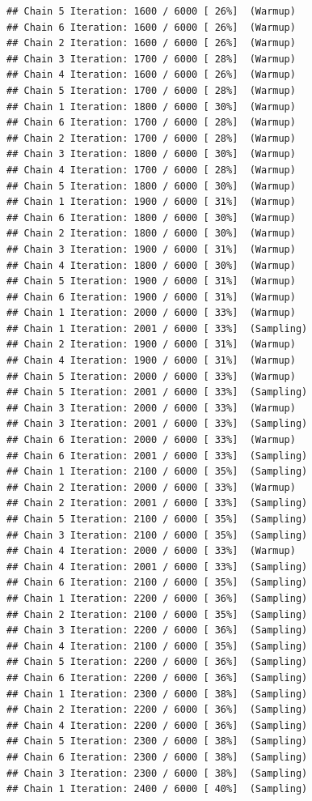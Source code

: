 \documentclass[
]{article}
\begin{document}
\begin{verbatim}
## Chain 5 Iteration: 1600 / 6000 [ 26%]  (Warmup) 
## Chain 6 Iteration: 1600 / 6000 [ 26%]  (Warmup) 
## Chain 2 Iteration: 1600 / 6000 [ 26%]  (Warmup) 
## Chain 3 Iteration: 1700 / 6000 [ 28%]  (Warmup) 
## Chain 4 Iteration: 1600 / 6000 [ 26%]  (Warmup) 
## Chain 5 Iteration: 1700 / 6000 [ 28%]  (Warmup) 
## Chain 1 Iteration: 1800 / 6000 [ 30%]  (Warmup) 
## Chain 6 Iteration: 1700 / 6000 [ 28%]  (Warmup) 
## Chain 2 Iteration: 1700 / 6000 [ 28%]  (Warmup) 
## Chain 3 Iteration: 1800 / 6000 [ 30%]  (Warmup) 
## Chain 4 Iteration: 1700 / 6000 [ 28%]  (Warmup) 
## Chain 5 Iteration: 1800 / 6000 [ 30%]  (Warmup) 
## Chain 1 Iteration: 1900 / 6000 [ 31%]  (Warmup) 
## Chain 6 Iteration: 1800 / 6000 [ 30%]  (Warmup) 
## Chain 2 Iteration: 1800 / 6000 [ 30%]  (Warmup) 
## Chain 3 Iteration: 1900 / 6000 [ 31%]  (Warmup) 
## Chain 4 Iteration: 1800 / 6000 [ 30%]  (Warmup) 
## Chain 5 Iteration: 1900 / 6000 [ 31%]  (Warmup) 
## Chain 6 Iteration: 1900 / 6000 [ 31%]  (Warmup) 
## Chain 1 Iteration: 2000 / 6000 [ 33%]  (Warmup) 
## Chain 1 Iteration: 2001 / 6000 [ 33%]  (Sampling) 
## Chain 2 Iteration: 1900 / 6000 [ 31%]  (Warmup) 
## Chain 4 Iteration: 1900 / 6000 [ 31%]  (Warmup) 
## Chain 5 Iteration: 2000 / 6000 [ 33%]  (Warmup) 
## Chain 5 Iteration: 2001 / 6000 [ 33%]  (Sampling) 
## Chain 3 Iteration: 2000 / 6000 [ 33%]  (Warmup) 
## Chain 3 Iteration: 2001 / 6000 [ 33%]  (Sampling) 
## Chain 6 Iteration: 2000 / 6000 [ 33%]  (Warmup) 
## Chain 6 Iteration: 2001 / 6000 [ 33%]  (Sampling) 
## Chain 1 Iteration: 2100 / 6000 [ 35%]  (Sampling) 
## Chain 2 Iteration: 2000 / 6000 [ 33%]  (Warmup) 
## Chain 2 Iteration: 2001 / 6000 [ 33%]  (Sampling) 
## Chain 5 Iteration: 2100 / 6000 [ 35%]  (Sampling) 
## Chain 3 Iteration: 2100 / 6000 [ 35%]  (Sampling) 
## Chain 4 Iteration: 2000 / 6000 [ 33%]  (Warmup) 
## Chain 4 Iteration: 2001 / 6000 [ 33%]  (Sampling) 
## Chain 6 Iteration: 2100 / 6000 [ 35%]  (Sampling) 
## Chain 1 Iteration: 2200 / 6000 [ 36%]  (Sampling) 
## Chain 2 Iteration: 2100 / 6000 [ 35%]  (Sampling) 
## Chain 3 Iteration: 2200 / 6000 [ 36%]  (Sampling) 
## Chain 4 Iteration: 2100 / 6000 [ 35%]  (Sampling) 
## Chain 5 Iteration: 2200 / 6000 [ 36%]  (Sampling) 
## Chain 6 Iteration: 2200 / 6000 [ 36%]  (Sampling) 
## Chain 1 Iteration: 2300 / 6000 [ 38%]  (Sampling) 
## Chain 2 Iteration: 2200 / 6000 [ 36%]  (Sampling) 
## Chain 4 Iteration: 2200 / 6000 [ 36%]  (Sampling) 
## Chain 5 Iteration: 2300 / 6000 [ 38%]  (Sampling) 
## Chain 6 Iteration: 2300 / 6000 [ 38%]  (Sampling) 
## Chain 3 Iteration: 2300 / 6000 [ 38%]  (Sampling) 
## Chain 1 Iteration: 2400 / 6000 [ 40%]  (Sampling) 

\end{verbatim}
\end{document}
